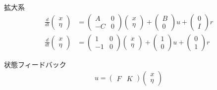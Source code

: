 \documentclass[a4paper,11pt]{jreport}
\begin{document}
拡大系
\begin{align*}
	\frac{d}{dt}
	\left (
	\begin{array}{c}
	 x \\ \eta 
	\end{array}
	\right )
	& = 
	\left (
	\begin{array}{cc}
	 A & 0 \\
	 -C& 0
	\end{array}
	\right )
	\left (
	\begin{array}{c}
	 x \\ \eta 
	\end{array}
	\right )
	+
	\left (
	\begin{array}{c}
	 B \\ 0 
	\end{array}
	\right )
	u
	+
	\left (
	\begin{array}{c}
	 0 \\ I 
	\end{array}
	\right )
	r
\\
	\frac{d}{dt}
	\left (
	\begin{array}{c}
	 x \\ \eta 
	\end{array}
	\right )
	& = 
	\left (
	\begin{array}{cc}
	 1 & 0 \\
	 -1& 0
	\end{array}
	\right )
	\left (
	\begin{array}{c}
	 x \\ \eta 
	\end{array}
	\right )
	+
	\left (
	\begin{array}{c}
	 1 \\ 0 
	\end{array}
	\right )
	u
	+
	\left (
	\begin{array}{c}
	 0 \\ 1 
	\end{array}
	\right )
	r
\end{align*}

状態フィードバック
\begin{align*}
	u = \left ( \begin{array}{cc}
			F & K \end{array} \right )
		\left (
		\begin{array}{c}
		 x \\ \eta 
		\end{array}
		\right )
\end{align*}
\end{document}
